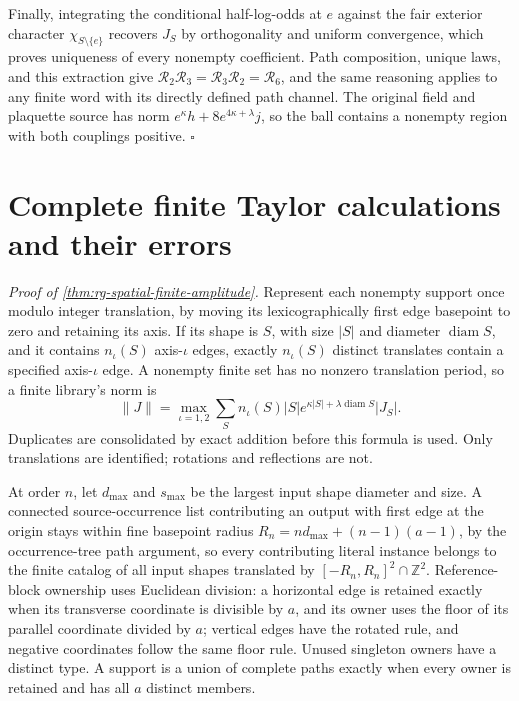 Finally, integrating the conditional half-log-odds at \(e\) against the
fair exterior character \(\chi_{S\setminus\{e\}}\) recovers \(J_S\) by
orthogonality and uniform convergence, which proves uniqueness of every
nonempty coefficient. Path composition, unique laws, and this extraction
give \(\mathscr R_2\mathscr R_3=\mathscr R_3\mathscr R_2=\mathscr R_6\), and
the same reasoning applies to any finite word with its directly defined
path channel. The original field and plaquette source has norm
\(e^\kappa h+8e^{4\kappa+\lambda}j\), so the ball contains a nonempty region
with both couplings positive. \hfill\(\square\)

\section{Complete finite Taylor calculations and their errors}
\label{sec:rg-spatial-proof-finite-amplitude}

\noindent\emph{Proof of \cref{thm:rg-spatial-finite-amplitude}.}
Represent each nonempty support once modulo integer translation, by moving
its lexicographically first edge basepoint to zero and retaining its axis.
If its shape is \(S\), with size \(|S|\) and diameter \(\operatorname{diam}
S\), and it contains \(n_\iota(S)\) axis-\(\iota\) edges, exactly
\(n_\iota(S)\) distinct translates contain a specified axis-\(\iota\) edge.
A nonempty finite set has no nonzero translation period, so a finite
library's norm is
\begin{equation}
 \|J\|=\max_{\iota=1,2}\sum_S n_\iota(S)|S|
                  e^{\kappa|S|+\lambda\operatorname{diam}S}|J_S|.
 \label{eq:rg-spatial-proof-finite-orbit-norm}
\end{equation}
Duplicates are consolidated by exact addition before this formula is used.
Only translations are identified; rotations and reflections are not.

At order \(n\), let \(d_{\max}\) and \(s_{\max}\) be the largest input
shape diameter and size. A connected source-occurrence list contributing an
output with first edge at the origin stays within fine basepoint radius
\(R_n=nd_{\max}+(n-1)(a-1)\), by the occurrence-tree path argument, so
every contributing literal instance belongs to the finite catalog of all
input shapes translated by \([-R_n,R_n]^2\cap\mathbb Z^2\). Reference-block
ownership uses Euclidean division: a horizontal edge is retained exactly
when its transverse coordinate is divisible by \(a\), and its owner uses
the floor of its parallel coordinate divided by \(a\); vertical edges have
the rotated rule, and negative coordinates follow the same floor rule.
Unused singleton owners have a distinct type. A support is a union of
complete paths exactly when every owner is retained and has all \(a\)
distinct members.

